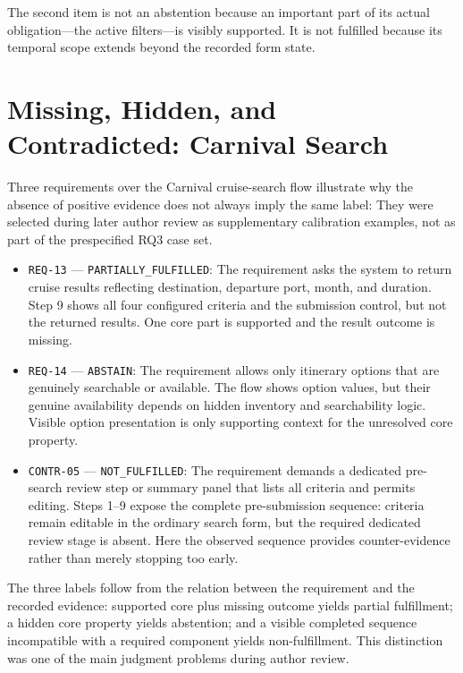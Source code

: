 The second item is not an abstention because an important part of its actual
obligation---the active filters---is visibly supported. It is not fulfilled because
its temporal scope extends beyond the recorded form state.

\section{Missing, Hidden, and Contradicted: Carnival Search}\label{missing-hidden-and-contradicted-carnival-search}

Three requirements over the Carnival cruise-search flow illustrate why the
absence of positive evidence does not always imply the same label:
They were selected during later author review as supplementary calibration
examples, not as part of the prespecified RQ3 case set.

\begin{itemize}
\tightlist
\item
  \texttt{REQ-13} --- \texttt{PARTIALLY\_\allowbreak FULFILLED}: The requirement asks the system to return
  cruise results reflecting destination, departure port, month, and duration.
  Step 9 shows all four configured criteria and the submission control, but not
  the returned results. One core part is supported and the result outcome is
  missing.
\item
  \texttt{REQ-14} --- \texttt{ABSTAIN}: The requirement allows only itinerary options that are
  genuinely searchable or available. The flow shows option values, but their
  genuine availability depends on hidden inventory and searchability logic.
  Visible option presentation is only supporting context for the unresolved
  core property.
\item
  \texttt{CONTR-05} --- \texttt{NOT\_FULFILLED}: The requirement demands a dedicated pre-search
  review step or summary panel that lists all criteria and permits editing.
  Steps 1--9 expose the complete pre-submission sequence: criteria remain
  editable in the ordinary search form, but the required dedicated review stage
  is absent. Here the observed sequence provides counter-evidence rather than
  merely stopping too early.
\end{itemize}

The three labels follow from the relation between the requirement and the
recorded evidence: supported core plus missing outcome yields partial
fulfillment; a hidden core property yields abstention; and a visible completed
sequence incompatible with a required component yields non-fulfillment. This
distinction was one of the main judgment problems during author review.

